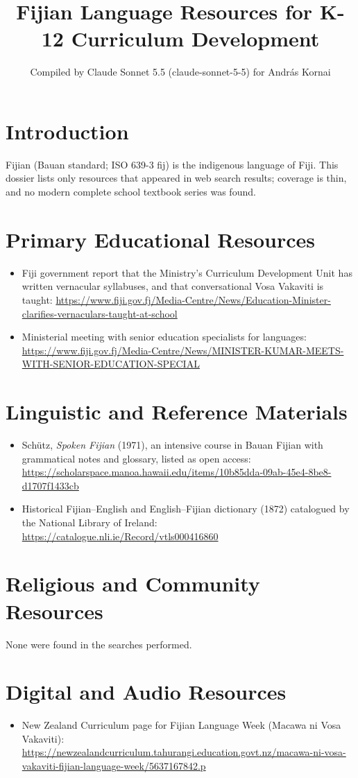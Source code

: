 \documentclass[12pt]{article}
\title{Fijian Language Resources for K-12 Curriculum Development}
\author{Compiled by Claude Sonnet 5.5 (claude-sonnet-5-5) for Andr\'as Kornai}
\date{}
\begin{document}
\maketitle
\section{Introduction}
Fijian (Bauan standard; ISO 639-3 fij) is the indigenous language of Fiji. This dossier lists only resources that appeared in web search results; coverage is thin, and no modern complete school textbook series was found.
\section{Primary Educational Resources}
\begin{itemize}
\item Fiji government report that the Ministry's Curriculum Development Unit has written vernacular syllabuses, and that conversational Vosa Vakaviti is taught: \url{https://www.fiji.gov.fj/Media-Centre/News/Education-Minister-clarifies-vernaculars-taught-at-school}
\item Ministerial meeting with senior education specialists for languages: \url{https://www.fiji.gov.fj/Media-Centre/News/MINISTER-KUMAR-MEETS-WITH-SENIOR-EDUCATION-SPECIAL}
\end{itemize}
\section{Linguistic and Reference Materials}
\begin{itemize}
\item Sch\"utz, \emph{Spoken Fijian} (1971), an intensive course in Bauan Fijian with grammatical notes and glossary, listed as open access: \url{https://scholarspace.manoa.hawaii.edu/items/10b85dda-09ab-45e4-8be8-d1707f1433cb}
\item Historical Fijian--English and English--Fijian dictionary (1872) catalogued by the National Library of Ireland: \url{https://catalogue.nli.ie/Record/vtls000416860}
\end{itemize}
\section{Religious and Community Resources}
None were found in the searches performed.
\section{Digital and Audio Resources}
\begin{itemize}
\item New Zealand Curriculum page for Fijian Language Week (Macawa ni Vosa Vakaviti): \url{https://newzealandcurriculum.tahurangi.education.govt.nz/macawa-ni-vosa-vakaviti-fijian-language-week/5637167842.p}
\end{itemize}
\end{document}
